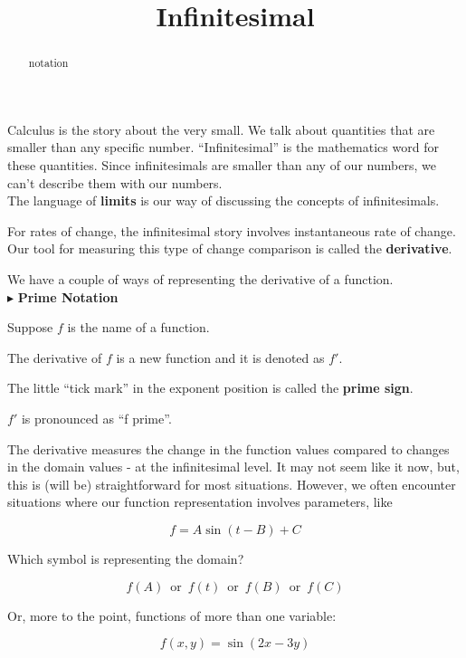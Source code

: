 \documentclass{ximera}
\title{Infinitesimal}
\begin{document}
\begin{abstract}
notation
\end{abstract}
\maketitle




Calculus is the story about the very small.  We talk about quantities that are smaller than any specific number.  ``Infinitesimal'' is the mathematics word for these quantities. Since infinitesimals are smaller than any of our numbers, we can't describe them with our numbers.  \\

The language of \textbf{limits} is our way of discussing the concepts of infinitesimals.  


For rates of change, the infinitesimal story involves instantaneous rate of change.  Our tool for measuring this type of change comparison is called the \textbf{derivative}.

We have a couple of ways of representing the derivative of a function. \\


$\blacktriangleright$  \textbf{\textcolor{purple!85!blue}{Prime Notation}}


Suppose $f$ is the name of a function.

The derivative of $f$ is a new function and it is denoted as \textbf{\textcolor{purple!85!blue}{$f'$}}.

The little ``tick mark'' in the exponent position is called the \textbf{\textcolor{purple!85!blue}{prime sign}}.


$f'$ is pronounced as ``f prime''.


The derivative measures the change in the function values compared to changes in the domain values - at the infinitesimal level. It may not seem like it now, but, this is (will be) straightforward for most situations.  However, we often encounter situations where our function representation involves parameters, like


\[
f = A \sin(t - B) + C
\]

Which symbol is representing the domain?


\[
f(A)   \, \text{ or } \, f(t)   \, \text{ or } \, f(B)   \, \text{ or } \, f(C)   
\]


Or, more to the point, functions of more than one variable:


\[
f(x, y) = \sin(2x - 3y)
\]
\end{document}
